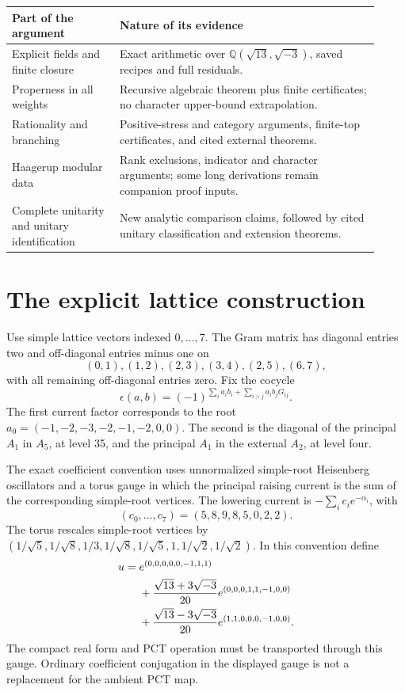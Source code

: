 \documentclass[11pt,a4paper]{article}
\theoremstyle{definition}
\newcommand{\QQ}{\mathbb Q}
\begin{document}
\begin{center}
\begin{tabular}{@{}p{0.27\linewidth}p{0.65\linewidth}@{}}
\toprule
Part of the argument & Nature of its evidence \\
\midrule
Explicit fields and finite closure & Exact arithmetic over
\(\QQ(\sqrt{13},\sqrt{-3})\), saved recipes and full residuals.\\
Properness in all weights & Recursive algebraic theorem plus finite
certificates; no character upper-bound extrapolation.\\
Rationality and branching & Positive-stress and category arguments,
finite-top certificates, and cited external theorems.\\
Haagerup modular data & Rank exclusions, indicator and character
arguments; some long derivations remain companion proof inputs.\\
Complete unitarity and unitary identification & New analytic comparison
claims, followed by cited unitary classification and extension theorems.\\
\bottomrule
\end{tabular}
\end{center}

\section{The explicit lattice construction}\label{sec:construction}
Use simple lattice vectors indexed \(0,\ldots,7\). The Gram matrix
has diagonal entries two and off-diagonal entries minus one on
\[
 (0,1),(1,2),(2,3),(3,4),(2,5),(6,7),
\]
with all remaining off-diagonal entries zero. Fix the cocycle
\begin{equation}\label{eq:cocycle}
 \epsilon(a,b)=(-1)^{\sum_i a_i b_i+
                      \sum_{i>j}a_i b_jG_{ij}}.
\end{equation}
The first current factor corresponds to the root
\(a_0=(-1,-2,-3,-2,-1,-2,0,0)\). The second is the diagonal of the
principal \(A_1\) in \(A_5\), at level 35, and the principal \(A_1\)
in the external \(A_2\), at level four.

The exact coefficient convention uses unnormalized simple-root
Heisenberg oscillators and a torus gauge in which the principal raising
current is the sum of the corresponding simple-root vertices. The
lowering current is \(-\sum_i c_i e^{-\alpha_i}\), with
\[
 (c_0,\ldots,c_7)=(5,8,9,8,5,0,2,2).
\]
The torus rescales simple-root vertices by
\( (1/\sqrt5,1/\sqrt8,1/3,1/\sqrt8,1/\sqrt5,1,1/\sqrt2,1/\sqrt2)\).
In this convention define
\begin{align}
 u={}&e^{(0,0,0,0,0,-1,1,1)}\notag\\
 &+\frac{\sqrt{13}+3\sqrt{-3}}{20}
                   e^{(0,0,0,1,1,-1,0,0)}\notag\\
 &+\frac{\sqrt{13}-3\sqrt{-3}}{20}
                   e^{(1,1,0,0,0,-1,0,0)}.\label{eq:u}
\end{align}
The compact real form and PCT operation must be transported through
this gauge. Ordinary coefficient conjugation in the displayed gauge
is not a replacement for the ambient PCT map.
\end{document}
